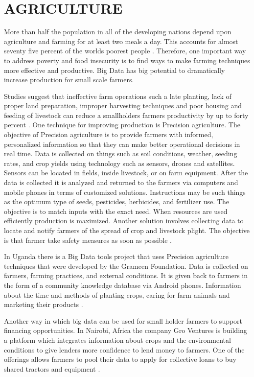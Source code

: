 \documentclass[sigconf]{acmart}
\begin{document}
\section{AGRICULTURE}

More than half the population in all of the developing nations depend upon agriculture and farming for at least two meals a day. This accounts for almost seventy five percent of the worlds poorest people \cite{www-google-top10}.  Therefore, one important way to address poverty and food insecurity is to find ways to make farming techniques more effective and productive. Big Data has big potential to dramatically increase production for small scale farmers.

Studies suggest that ineffective farm operations such a late planting, lack of proper land preparation, improper harvesting techniques and poor housing and feeding of livestock can reduce a smallholders farmers productivity by up to forty percent \cite{DevEcon}.
One technique for improving production is Precision agriculture. The objective of Precision agriculture is to provide farmers with informed, personalized information so that they can make better operational decisions in real time. Data is collected on things such as soil conditions, weather, seeding rates, and crop yields using technology such as sensors, drones and satellites. Sensors can be located in fields, inside livestock, or on farm equipment.  After the data is collected it is analyzed and returned to the farmers via computers and mobile phones in terms of customized solutions. Instructions may be such things as the optimum type of seeds, pesticides, herbicides, and fertilizer use. The objective is to match inputs with the exact need. When resources are used efficiently production is maximized. Another solution involves collecting data to locate and notify farmers of the spread of crop and livestock plight. The objective is that farmer take safety measures as soon as possible \cite{www-google-Hffpst}.

In Uganda there is a Big Data tools project that uses Precision agriculture techniques that were developed by the Grameen Foundation. Data is collected on farmers, farming practices, and external conditions. It is given back to farmers in the form of a community knowledge database via Android phones. Information about the time and methods of planting crops, caring for farm animals and marketing their products \cite{www-google-Hffpst}.

Another way in which big data can be used for small holder farmers to support financing opportunities. In Nairobi, Africa the company Gro Ventures is building a platform which integrates information about crops and the environmental conditions to give lenders more confidence to lend money to farmers. One of the offerings allows farmers to pool their data to apply for collective loans to buy shared tractors and equipment \cite{www-google-Hffpst}.  
\end{document}
